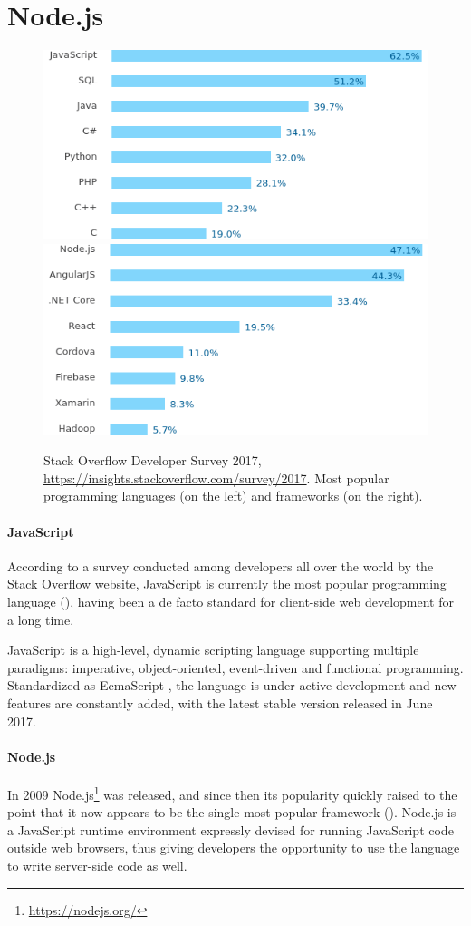 \section{Node.js}
\label{sec:node}
\begin{figure}
	\includegraphics[width=.5\textwidth]{fig/languages}
	\includegraphics[width=.5\textwidth]{fig/frameworks}
	\caption{Stack Overflow Developer Survey 2017, \url{https://insights.stackoverflow.com/survey/2017}. Most popular programming languages (on the left) and frameworks (on the right).}
	\label{fig:popularity}
\end{figure}
\paragraph{JavaScript}
According to a survey conducted among developers all over the world by the Stack Overflow website, JavaScript is currently the most popular programming language (), having been a de facto standard for client-side web development for a long time.

JavaScript is a high-level, dynamic scripting language supporting multiple paradigms: imperative, object-oriented, event-driven and functional programming.
Standardized as EcmaScript \cite{EcmaScript}, the language is under active development and new features are constantly added, with the latest stable version released in June 2017.

\paragraph{Node.js}
In 2009 Node.js\footnote{\url{https://nodejs.org/}} was released, and since then its popularity quickly raised to the point that it now appears to be the single most popular framework ().
Node.js is a JavaScript runtime environment expressly devised for running JavaScript code outside web browsers, thus giving developers the opportunity to use the language to write server-side code as well.

